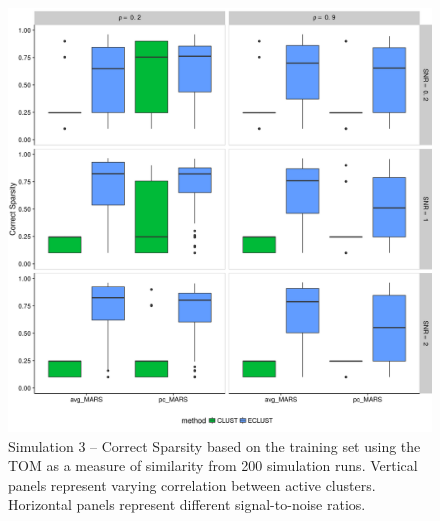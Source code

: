 \begin{appendices}
\begin{figure}[H]
	\centering
	\includegraphics[scale=0.6, keepaspectratio]{./figs/hydra/results/figures/sim3-sept27/CorrectSparsity_TOM_sim3.png}
	\caption{Simulation 3 -- Correct Sparsity based on the training set using the TOM as a measure of similarity from 200 simulation runs. Vertical panels represent varying correlation between active clusters. Horizontal panels represent different signal-to-noise ratios.}
	\label{fig:CorrectSparsity_TOM_sim3}
\end{figure}



\end{appendices}
